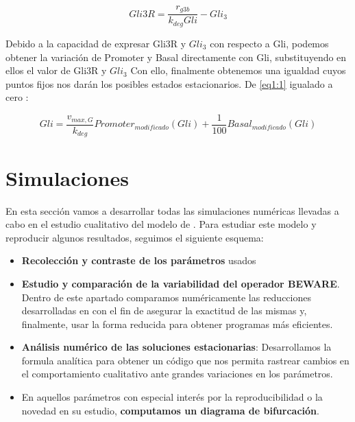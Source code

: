 \begin{equation}
 Gli3R=\frac{r_{g3b}}{k_{deg}Gli}-Gli_3
 \label{equgli3r}
 \end{equation}

Debido a la capacidad de expresar Gli3R y $Gli_3$ con respecto a Gli, podemos obtener la variación de Promoter y Basal directamente con Gli, substituyendo en ellos el valor de Gli3R y $Gli_3$
Con ello, finalmente obtenemos una igualdad cuyos puntos fijos nos darán los posibles estados estacionarios. De \ref{eq1:1} igualado a cero :

 \begin{equation}
 Gli=\frac{v_{max,G}}{k_{deg}}Promoter_{modificado}(Gli)+\frac{1}{100}Basal_{modificado}(Gli)
 \label{final_gli}
 \end{equation}


\section{Simulaciones}

En esta sección vamos a desarrollar todas las simulaciones numéricas llevadas a cabo en el estudio cualitativo del modelo de \cite{schaffer}.
Para estudiar este modelo y reproducir algunos resultados, seguimos el siguiente esquema:
\begin{itemize}
	\item \textbf{Recolección y contraste de los parámetros} usados
	\item \textbf{Estudio y comparación de la variabilidad del operador BEWARE}. Dentro de este apartado comparamos numéricamente las reducciones desarrolladas en \cite{multiple} con el fin de asegurar la exactitud de las mismas y, finalmente, usar la forma reducida para obtener programas más eficientes.
	\item \textbf{Análisis numérico de las soluciones estacionarias}: Desarrollamos la formula analítica para obtener un código que nos permita rastrear cambios en el comportamiento cualitativo ante grandes variaciones en los parámetros.
	\item En aquellos parámetros con especial interés por la reproducibilidad o la novedad en su estudio, \textbf{computamos un diagrama de bifurcación}.
\end{itemize}
